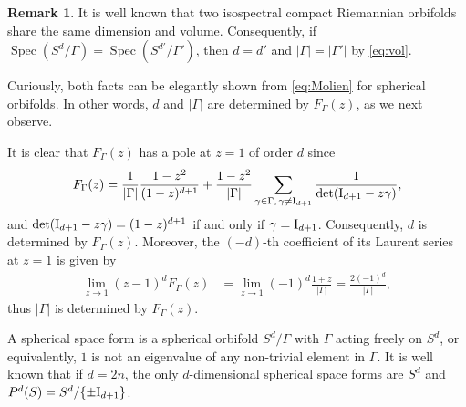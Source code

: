\documentclass[12pt,a4paper,final]{amsart}
\theoremstyle{plain}
\theoremstyle{definition}
\newtheorem{remark}[theorem]{Remark}
\theoremstyle{remark}
\numberwithin{equation}{section}
\newcommand{\Id}{\textup{I}}
\DeclareMathOperator{\Spec}{Spec}
\begin{document}
\begin{remark}\label{rem:volume}
It is well known that two isospectral compact Riemannian orbifolds share the same dimension and volume. 
Consequently, if $\Spec(S^d/\Gamma)=\Spec(S^{d'}/\Gamma')$, then $d=d'$ and $|\Gamma|=|\Gamma'|$ by \eqref{eq:vol}. 


Curiously, both facts can be elegantly shown from \eqref{eq:Molien} for spherical orbifolds. 
In other words, $d$ and $|\Gamma|$ are determined by $F_{\Gamma}(z)$, as we next observe. 

It is clear that $F_{\Gamma}(z)$ has a pole at $z=1$ of order $d$ since
$$
F_{\Gamma}(z)=\frac{1}{|\Gamma|} \frac{1-z^2}{(1-z)^{d+1}} + \frac{1-z^2}{|\Gamma|} \sum_{\gamma\in\Gamma,\,\gamma\neq\Id_{d+1}} \frac{1}{\det(\Id_{d+1}-z\gamma)}
,
$$
and $\det(\Id_{d+1}-z\gamma)=(1-z)^{d+1}$ if and only if $\gamma=\Id_{d+1}$. 
Consequently, $d$ is determined by $F_{\Gamma}(z)$. 
Moreover, the $(-d)$-th coefficient of its Laurent series at $z=1$ is given by 
\begin{align*}
\lim_{z\to1} (z-1)^{d}F_{\Gamma}(z) &
=\lim_{z\to1} (-1)^{d}\frac{1+z}{|\Gamma|} 
= \frac{2(-1)^{d}}{|\Gamma|} ,
\end{align*}  
thus $|\Gamma|$ is determined by $F_{\Gamma}(z)$. 
\end{remark}

A spherical space form is a spherical orbifold $S^{d}/\Gamma$ with $\Gamma$ acting freely on $S^{d}$, or equivalently, $1$ is not an eigenvalue of any non-trivial element in $\Gamma$. 
It is well known that if $d=2n$, the only $d$-dimensional spherical space forms are $S^d$ and $P^d(S)=S^{d}/\{\pm\Id_{d+1}\}$. 
\end{document}
